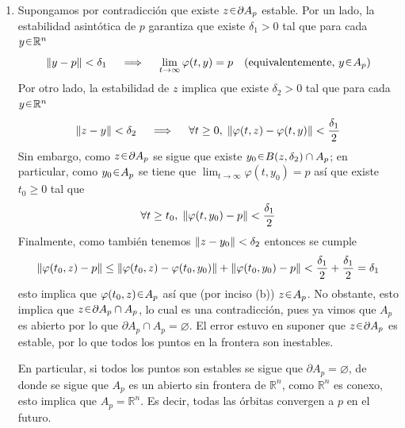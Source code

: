 \begin{sol}[Demostración]
\begin{enumerate}
\item[(c)] Supongamos por contradicción que existe $z \en \partial A_p$ estable. Por un lado, la estabilidad asintótica de $p$ garantiza que existe $\delta_1 >0$ tal que para cada $y \en \mathbb{R}^n$
\[
\norm{y-p} < \delta_1%
\quad\implies\quad%
\lim_{t\to\infty} \varphi(t,y) = p%
\quad\text{(equivalentemente, $y \en A_p$)}
\]
Por otro lado, la estabilidad de $z$ implica que existe $\delta_2 > 0$ tal que para cada $y \en \mathbb{R}^n$
\[
\norm{z-y} < \delta_2%
\quad\implies\quad%
\forall t\geq0,\;\norm{\varphi(t,z) - \varphi(t,y)} < \frac{\delta_1}{2}
\]
Sin embargo, como $z \en \partial A_p$ se sigue que existe $y_0 \en B(z,\delta_2) \cap A_p$; en particular, como $y_0 \en A_p$ se tiene que $\lim_{t\to\infty}\varphi(t,y_0) = p$ así que existe $t_0\geq0$ tal que
\[
\forall t \geq t_0,\;\norm{\varphi(t,y_0) - p} < \frac{\delta_1}{2}
\]
Finalmente, como también tenemos $\norm{z-y_0} < \delta_2$ entonces se cumple
\[
\norm{\varphi(t_0,z) - p} \leq \norm{\varphi(t_0,z) - \varphi(t_0,y_0)} + \norm{\varphi(t_0,y_0) - p} < \frac{\delta_1}{2} + \frac{\delta_1}{2} = \delta_1
\]
esto implica que $\varphi(t_0,z) \en A_p$ así que (por inciso (b)) $z \en A_p$. No obstante, esto implica que $z \en \partial A_p \cap A_p$, lo cual es una contradicción, pues ya vimos que $A_p$ es abierto por lo que $\partial A_p \cap A_p = \varnothing$. El error estuvo en suponer que $z \en \partial A_p$ es estable, por lo que todos los puntos en la frontera son inestables.\par
En particular, si todos los puntos son estables se sigue que $\partial A_p = \varnothing$, de donde se sigue que $A_p$ es un abierto sin frontera de $\mathbb{R}^n$, como $\mathbb{R}^n$ es conexo, esto implica que $A_p = \mathbb{R}^n$. Es decir, todas las órbitas convergen a $p$ en el futuro.
\end{enumerate}
\end{sol}